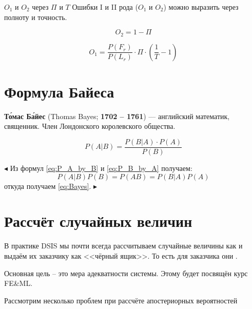 \begin{frame}{$O_1$ и $O_2$ через $\Pi$ и $T$}
	Ошибки I и II рода ($O_1$ и $O_2$)
	можно выразить через полноту и точность.
	
	\begin{equation}\label{eq:O_2_from_recall}
	O_2 = 1 - \Pi
	\end{equation}
	
	\begin{equation}\label{eq:O_1_from_recall_and_presicion}
	O_1 = \frac{P(F_r)}{P(L_r)} \cdot \Pi \cdot \left( \frac{1}{T} - 1 \right)
	\end{equation}
	
	
	
\end{frame}




\section{Формула Байеса}\label{section:Bayes}

\begin{frame}
\textbf{То́мас Ба́йес}
(Thomas Bayes; \textbf{1702 -- 1761}) 
— английский математик, священник. 
Член Лондонского королевского общества.
	
\begin{equation}\label{eq:Bayes}
P(A|B) = \frac{P(B|A) \cdot P(A)}{P(B)}
\end{equation}

$\blacktriangleleft$
Из формул \eqref{eq:P_A_by_B} и \eqref{eq:P_B_by_A}
получаем:
\begin{equation*}
P(A|B)P(B) = P(AB) = P(B|A) P(A)
\end{equation*}
откуда получаем \eqref{eq:Bayes}.
$\blacktriangleright$


\end{frame}




\section{Рассчёт случайных величин}\label{section:probability_computation}

\begin{frame}
	В практике DSIS мы почти всегда рассчитываем случайные величины как 
	и выдаём их заказчику как <<чёрный ящик>>. То есть для заказчика они .
	
	Основная цель -- это мера адекватности системы. Этому будет посвящён курс FE\&ML.
	
	Рассмотрим несколько проблем при рассчёте апостериорных вероятностей
\end{frame}

